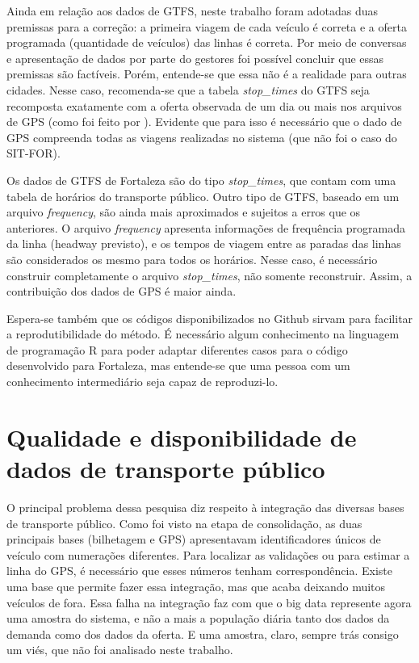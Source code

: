 \documentclass[        
    a4paper,          %
    12pt,             %
    chapter=TITLE,    %
    section=Title,    %
    subsection=Title, %
    oneside,          %
    english,          %
    spanish,          %
    brazil,           %
    fleqn             %
]{abntex2}
\begin{document}
  Ainda em relação aos dados de GTFS, neste trabalho foram adotadas duas premissas para a correção: a primeira viagem de cada veículo é correta e a oferta programada (quantidade de veículos) das linhas é correta. Por meio de conversas e apresentação de dados por parte do gestores foi possível concluir que essas premissas são factíveis. Porém, entende-se que essa não é a realidade para outras cidades. Nesse caso, recomenda-se que a tabela \emph{stop\_times} do GTFS seja recomposta exatamente com a oferta observada de um dia ou mais nos arquivos de GPS (como foi feito por \citet{Wessel2017}). Evidente que para isso é necessário que o dado de GPS compreenda todas as viagens realizadas no sistema (que não foi o caso do SIT-FOR).
  
  Os dados de GTFS de Fortaleza são do tipo \emph{stop\_times}, que contam com uma tabela de horários do transporte público. Outro tipo de GTFS, baseado em um arquivo \emph{frequency}, são ainda mais aproximados e sujeitos a erros que os anteriores. O arquivo \emph{frequency} apresenta informações de frequência programada da linha (headway previsto), e os tempos de viagem entre as paradas das linhas são considerados os mesmo para todos os horários. Nesse caso, é necessário construir completamente o arquivo \emph{stop\_times}, não somente reconstruir. Assim, a contribuição dos dados de GPS é maior ainda.
  
  Espera-se também que os códigos disponibilizados no Github sirvam para facilitar a reprodutibilidade do método. É necessário algum conhecimento na linguagem de programação R para poder adaptar diferentes casos para o código desenvolvido para Fortaleza, mas entende-se que uma pessoa com um conhecimento intermediário seja capaz de reproduzi-lo.
  
  \hypertarget{qualidade-e-disponibilidade-de-dados-de-transporte-publico}{%
  \section{Qualidade e disponibilidade de dados de transporte público}\label{qualidade-e-disponibilidade-de-dados-de-transporte-publico}}
  
  O principal problema dessa pesquisa diz respeito à integração das diversas bases de transporte público. Como foi visto na etapa de consolidação, as duas principais bases (bilhetagem e GPS) apresentavam identificadores únicos de veículo com numerações diferentes. Para localizar as validações ou para estimar a linha do GPS, é necessário que esses números tenham correspondência. Existe uma base que permite fazer essa integração, mas que acaba deixando muitos veículos de fora. Essa falha na integração faz com que o big data represente agora uma amostra do sistema, e não a mais a população diária tanto dos dados da demanda como dos dados da oferta. E uma amostra, claro, sempre trás consigo um viés, que não foi analisado neste trabalho.
  
\end{document}
